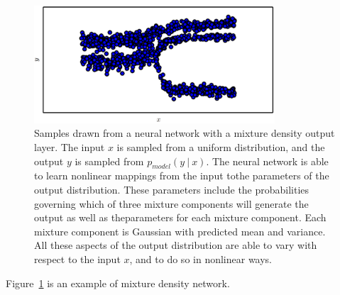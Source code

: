 \begin{itemize}
    \setcounter{figure}{3}
    \begin{figure}[ht]
      \begin{center}
        \includegraphics[width=0.8\textwidth]{FIG/fig6_4.PNG}
        \caption{Samples drawn from a neural network with a mixture density output layer.
          The input $x$ is sampled from a uniform distribution,
          and the output $y$ is sampled from $p _ {model} (y\ |\ x)$.
          The neural network is able to learn nonlinear mappings from the input tothe parameters of the output distribution.
          These parameters include the probabilities governing which of three mixture components will generate the output as well as theparameters for each mixture component.
          Each mixture component is Gaussian with predicted mean and variance.
          All these aspects of the output distribution are able to vary with respect to the input $x$,
          and to do so in nonlinear ways.
        }\label{fig:NN_mixture_density_output_layer}
      \end{center}
    \end{figure}

    Figure~\ref{fig:NN_mixture_density_output_layer} is an example of mixture density network.

  \end{itemize}


